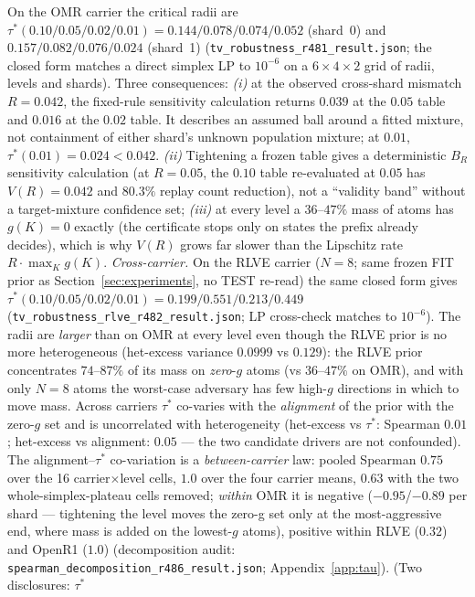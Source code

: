\documentclass{article}
\theoremstyle{definition}
\theoremstyle{remark}
\begin{document}
On the OMR carrier the critical radii are
$\tau^*(0.10/0.05/0.02/0.01)=0.144/0.078/0.074/0.052$
(shard~0) and $0.157/0.082/0.076/0.024$ (shard~1)
(\texttt{tv\_robustness\_r481\_result.json}; the closed form matches a direct
simplex LP to $10^{-6}$ on a $6\times4\times2$ grid of radii, levels and
shards). Three consequences: \emph{(i)} at the observed cross-shard mismatch
$R=0.042$, the fixed-rule sensitivity calculation returns $0.039$ at the
$0.05$ table and $0.016$ at the $0.02$ table. It describes an assumed ball
around a fitted mixture, not containment of either shard's unknown population
mixture; at $0.01$, $\tau^*(0.01)=0.024<0.042$. \emph{(ii)} Tightening a frozen
table gives a deterministic $B_R$ sensitivity calculation (at $R=0.05$, the
$0.10$ table re-evaluated at $0.05$ has $V(R)=0.042$ and $80.3\%$ replay count
reduction), not a ``validity band'' without a target-mixture confidence set;
\emph{(iii)} at every level a $36$--$47\%$ mass of atoms has
$g(K)=0$ exactly (the certificate stops only on states the prefix already
decides), which is why $V(R)$ grows far slower than the Lipschitz rate
$R\cdot\max_K g(K)$.
\emph{Cross-carrier.} On the RLVE carrier ($N{=}8$; same frozen FIT prior as
Section~\ref{sec:experiments}, no TEST re-read) the same closed form gives
$\tau^*(0.10/0.05/0.02/0.01)=0.199/0.551/0.213/0.449$
(\texttt{tv\_robustness\_rlve\_r482\_result.json}; LP cross-check matches to
$10^{-6}$). The radii are \emph{larger} than on OMR at every level even
though the RLVE prior is no more heterogeneous (het-excess variance
$0.0999$ vs $0.129$): the RLVE prior concentrates $74$--$87\%$ of its mass
on \emph{zero}-$g$ atoms (vs $36$--$47\%$ on OMR), and with only $N{=}8$
atoms the worst-case adversary has few high-$g$ directions in which to
move mass. Across carriers $\tau^*$ co-varies with the \emph{alignment} of
the prior with the zero-$g$ set and is uncorrelated with heterogeneity
(het-excess vs $\tau^*$: Spearman $0.01$; het-excess vs alignment: $0.05$
--- the two candidate drivers are not confounded). The
alignment--$\tau^*$ co-variation is a \emph{between-carrier} law: pooled
Spearman $0.75$ over the 16 carrier$\times$level cells, $1.0$ over the
four carrier means, $0.63$ with the two whole-simplex-plateau cells
removed; \emph{within} OMR it is negative ($-0.95$/$-0.89$ per shard ---
tightening the level moves the zero-g set only at the most-aggressive
end, where mass is added on the lowest-$g$ atoms), positive within RLVE
($0.32$) and OpenR1 ($1.0$) (decomposition audit:
\texttt{spearman\_decomposition\_r486\_result.json};
Appendix~\ref{app:tau}). (Two disclosures: $\tau^*$
\end{document}
